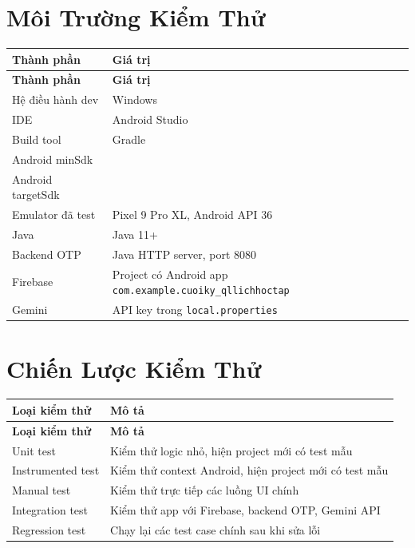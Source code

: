 \documentclass[12pt,a4paper]{report}
\begin{document}
\section{Môi Trường Kiểm Thử}

\begin{longtable}{|>{\raggedright\arraybackslash}p{}|>{\raggedright\arraybackslash}p{}|}
\hline
\textbf{Thành phần} & \textbf{Giá trị} \\ \hline
\endfirsthead
\hline
\textbf{Thành phần} & \textbf{Giá trị} \\ \hline
\endhead
Hệ điều hành dev & Windows \\ \hline
IDE & Android Studio \\ \hline
Build tool & Gradle \\ \hline
Android minSdk & 24 \\ \hline
Android targetSdk & 36 \\ \hline
Emulator đã test & Pixel 9 Pro XL, Android API 36 \\ \hline
Java & Java 11+ \\ \hline
Backend OTP & Java HTTP server, port 8080 \\ \hline
Firebase & Project có Android app \texttt{com.example.cuoiky\_qllichhoctap} \\ \hline
Gemini & API key trong \texttt{local.properties} \\ \hline
\end{longtable}

\section{Chiến Lược Kiểm Thử}

\begin{longtable}{|>{\raggedright\arraybackslash}p{}|>{\raggedright\arraybackslash}p{}|}
\hline
\textbf{Loại kiểm thử} & \textbf{Mô tả} \\ \hline
\endfirsthead
\hline
\textbf{Loại kiểm thử} & \textbf{Mô tả} \\ \hline
\endhead
Unit test & Kiểm thử logic nhỏ, hiện project mới có test mẫu \\ \hline
Instrumented test & Kiểm thử context Android, hiện project mới có test mẫu \\ \hline
Manual test & Kiểm thử trực tiếp các luồng UI chính \\ \hline
Integration test & Kiểm thử app với Firebase, backend OTP, Gemini API \\ \hline
Regression test & Chạy lại các test case chính sau khi sửa lỗi \\ \hline
\end{longtable}
\end{document}
